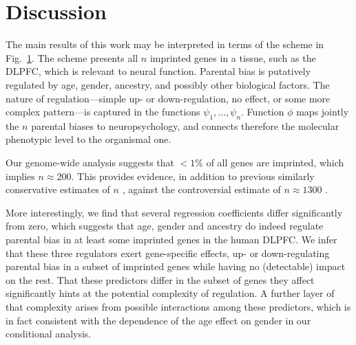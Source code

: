 \documentclass[letterpaper]{article}
\begin{document}
\section{Discussion}

The main results of this work may be interpreted in terms of the scheme in
Fig.~\ref{fig:scheme}.  The scheme presents all \(n\) imprinted genes in a
tissue, such as the DLPFC, which is relevant to neural function.  Parental
bias is putatively regulated by age, gender, ancestry, and possibly other
biological factors.  The nature of regulation---simple up- or down-regulation,
no effect, or some more complex pattern---is captured in the functions
\(\psi_1,...,\psi_n\).  Function \(\phi\) maps jointly the \(n\) parental
biases to neuropsychology, and connects therefore the molecular phenotypic
level to the organismal one.

\begin{figure}[h]
\begin{center}
\end{center}
\caption{}
\label{fig:scheme}
\end{figure}

Our genome-wide analysis suggests that \(<1\%\) of all genes are imprinted,
which implies \(n\approx 200\).  This provides evidence, in addition to
previous similarly conservative estimates of \(n\)
\cite{Perez2015,DeVeale2012}, against the controversial estimate of \(n\approx
1300\) \cite{Gregg2010a}.

More interestingly, we find that several regression coefficients differ
significantly from zero, which suggests that age, gender and ancestry do
indeed regulate parental bias in at least some imprinted genes in the human
DLPFC.  We infer that these three regulators exert gene-specific effects, up-
or down-regulating parental bias in a subset of imprinted genes while having
no (detectable) impact on the rest.  That these predictors differ in the
subset of genes they affect significantly hints at the potential complexity of
regulation.  A further layer of that complexity arises from possible
interactions among these predictors, which is in fact consistent with the
dependence of the age effect on gender in our conditional analysis.
\end{document}
